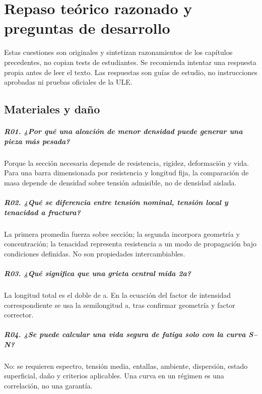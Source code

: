 \chapter{Repaso teórico razonado y preguntas de desarrollo}
\label{ch:repaso-teorico-matmo}
Estas cuestiones son originales y sintetizan razonamientos de los capítulos precedentes, no copian tests de estudiantes. Se recomienda intentar una respuesta propia antes de leer el texto. Las respuestas son guías de estudio, no instrucciones aprobadas ni pruebas oficiales de la ULE.

\section{Materiales y daño}

\paragraph{R01. ¿Por qué una aleación de menor densidad puede generar una pieza más pesada?} Porque la sección necesaria depende de resistencia, rigidez, deformación y vida. Para una barra dimensionada por resistencia y longitud fija, la comparación de masa depende de densidad sobre tensión admisible, no de densidad aislada.

\paragraph{R02. ¿Qué se diferencia entre tensión nominal, tensión local y tenacidad a fractura?} La primera promedia fuerza sobre sección; la segunda incorpora geometría y concentración; la tenacidad representa resistencia a un modo de propagación bajo condiciones definidas. No son propiedades intercambiables.

\paragraph{R03. ¿Qué significa que una grieta central mida 2a?} La longitud total es el doble de a. En la ecuación del factor de intensidad correspondiente se usa la semilongitud a, tras confirmar geometría y factor corrector.

\paragraph{R04. ¿Se puede calcular una vida segura de fatiga solo con la curva S--N?} No: se requieren espectro, tensión media, entallas, ambiente, dispersión, estado superficial, daño y criterios aplicables. Una curva en un régimen es una correlación, no una garantía.

